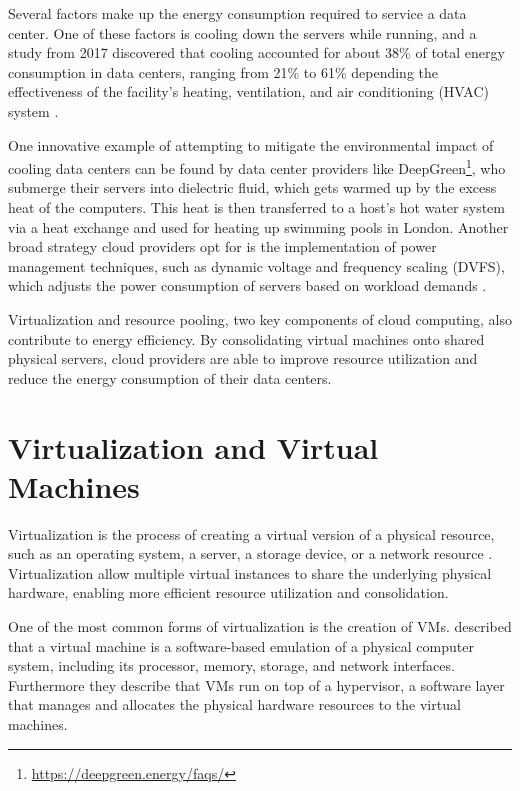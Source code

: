\documentclass[
  table]{report}
\begin{document}
Several factors make up the energy consumption required to service a
data center. One of these factors is cooling down the servers while
running, and a study from 2017 discovered that cooling accounted for
about 38\% of total energy consumption in data centers, ranging from
21\% to 61\% depending the effectiveness of the facility's heating,
ventilation, and air conditioning (HVAC) system
\citep{niReviewAirConditioning2017}.

One innovative example of attempting to mitigate the environmental
impact of cooling data centers can be found by data center providers
like DeepGreen\footnote{\url{https://deepgreen.energy/faqs/}}, who
submerge their servers into dielectric fluid, which gets warmed up by
the excess heat of the computers. This heat is then transferred to a
host's hot water system via a heat exchange and used for heating up
swimming pools in London. Another broad strategy cloud providers opt for
is the implementation of power management techniques, such as dynamic
voltage and frequency scaling (DVFS), which adjusts the power
consumption of servers based on workload demands
\citep{beloglazovEnergyawareResourceAllocation2012}.

Virtualization and resource pooling, two key components of cloud
computing, also contribute to energy efficiency. By consolidating
virtual machines onto shared physical servers, cloud providers are able
to improve resource utilization and reduce the energy consumption of
their data centers. \citep{beloglazovEnergyawareResourceAllocation2012}

\section{Virtualization and Virtual Machines}
\label{sect:virtual}

Virtualization is the process of creating a virtual version of a
physical resource, such as an operating system, a server, a storage
device, or a network resource
\citep{chiuehSurveyVirtualizationTechnologies2005}. Virtualization allow
multiple virtual instances to share the underlying physical hardware,
enabling more efficient resource utilization and consolidation.

One of the most common forms of virtualization is the creation of
\ac{VMs}. \citet{barhamXenArtVirtualization2003} described that a
virtual machine is a software-based emulation of a physical computer
system, including its processor, memory, storage, and network
interfaces. Furthermore they describe that \ac{VMs} run on top of a
hypervisor, a software layer that manages and allocates the physical
hardware resources to the virtual machines.
\end{document}
